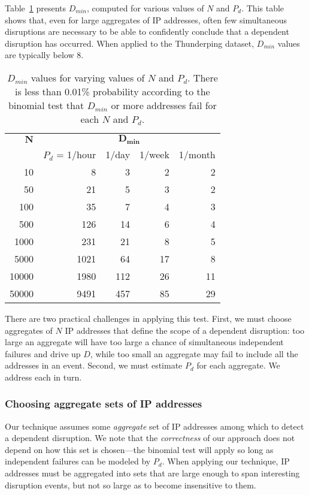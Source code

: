 Table~\ref{tbl:binomial_thresh} presents $D_{min}$, computed for
various values of $N$ and $P_d$.  This table shows that, even for
large aggregates of IP addresses, often few simultaneous disruptions
are necessary to be able to confidently conclude that a dependent
disruption has occurred. When applied to the Thunderping dataset,
$D_{min}$ values are typically below 8.

\begin{table}[th]
  \centering
  \hspace{-0.04in}
  \begin{tabular}{r|r|r|r|r}
	  $\mathbf{N}$ & \multicolumn{4}{c}{$\mathbf{D_{min}}$} \\
    & $P_d$ = 1/hour & 1/day & 1/week & 1/month \\
    \hline
10 & 8 & 3 & 2 & 2 \\
50 & 21 & 5 & 3 & 2 \\
100 & 35 & 7 & 4 & 3 \\
500 & 126 & 14 & 6 & 4 \\
1000 & 231 & 21 & 8 & 5 \\
5000 & 1021 & 64 & 17 & 8 \\
10000 & 1980 & 112 & 26 & 11 \\
50000 & 9491 & 457 & 85 & 29 \\
    \end{tabular}
  \caption[$D_{min}$ values for varying values of $N$ and $P_d$]{\label{tbl:binomial_thresh}
	  $D_{min}$ values for varying values of $N$ and $P_d$.  There is
	  less than 0.01\% probability according to the binomial 
	  test that $D_{min}$ or more addresses fail for each $N$ and
	  $P_d$.
  }
\end{table}


There are two practical challenges in applying this test.
First, we must choose aggregates of $N$ IP addresses that
define the scope of a dependent disruption: too large an
aggregate will have too large a chance of simultaneous independent
failures and drive up $D$, while too small an aggregate may fail to
include all the addresses in an event. 
Second, we must estimate $P_d$ for each aggregate.
We address each in turn.

\subsubsection{Choosing aggregate sets of IP addresses}

Our technique assumes some \emph{aggregate} set of IP addresses among
which to detect a dependent disruption.
%
We note that the \emph{correctness} of our approach does not depend on
how this set is chosen---the binomial test will apply so long as
independent failures can be modeled by $P_d$.
%
When applying our technique, IP
addresses must be aggregated into sets that are large enough to span interesting
disruption events, but not so large as to become insensitive to them.


